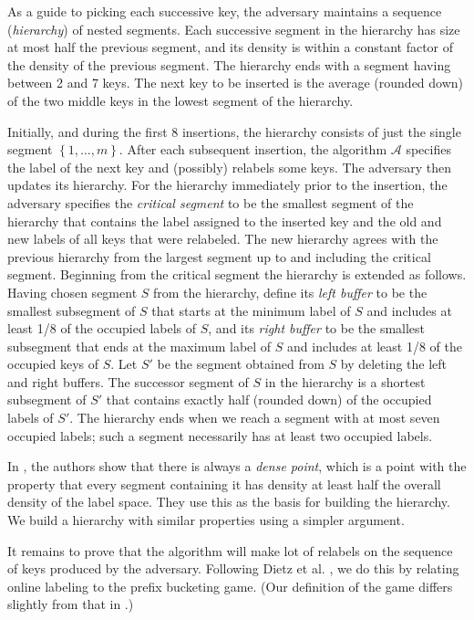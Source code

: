 \documentclass[11pt]{article}
\newcommand{\A}{\mathcal{A}}
\newcommand{\natInt}[2]{ \left\{ #1, \dotsc, #2 \right\} }
\begin{document}
As a guide to picking each successive key, the adversary maintains a sequence (\emph{hierarchy}) of nested segments.  Each successive segment in the hierarchy
has size at most half the previous segment, and its density  is within a constant factor of the density of the previous segment.
The hierarchy ends with a segment having between 2 and 7 keys.  The next key to be inserted is the average (rounded down)
of the two middle keys in the lowest segment of the hierarchy.


Initially, and during the first 8 insertions, the hierarchy consists of just the single segment $\natInt{1}{m}$.
After each subsequent insertion,
the algorithm $\A$ specifies the label of the next key and (possibly) relabels some keys. The adversary then updates
its hierarchy.  For the hierarchy immediately prior to the insertion, the adversary specifies the {\em critical segment} to be the smallest segment
of the hierarchy that contains the label assigned to the inserted key and the old and new labels
of all keys that were relabeled.  The new hierarchy agrees with the previous hierarchy from the largest segment up to and including
the critical segment.   Beginning from the critical segment the hierarchy is extended as follows.
Having chosen segment $S$ from the hierarchy, define its
{\em left buffer}
to be the smallest subsegment of $S$ that starts at the minimum label of $S$ and
includes at least 1/8 of the occupied labels of $S$, and its {\em right buffer} to be the smallest subsegment that ends at the maximum label of $S$
and includes at least 1/8 of the occupied keys of $S$.
Let $S'$ be the segment obtained from $S$ by
deleting the left and right buffers. The successor segment of $S$ in the hierarchy is
a shortest subsegment of $S'$ that contains exactly half (rounded down) of the occupied labels of $S'$.
The hierarchy ends when we reach a segment with at most seven occupied labels; such a segment necessarily has at least two occupied
labels.

In \cite{DSZ04}, the authors show that there is always a \emph{dense point}, which is
a point  with the property that every segment containing it
has density at least half the overall density of the label space.  They use this as the basis for building the hierarchy.
We build a hierarchy with similar properties using a simpler argument.

It remains to prove that the algorithm will make lot of relabels on the sequence
of keys produced by the adversary.  Following  Dietz et al. \cite{DSZ04}, we 
do this by relating online labeling to the prefix bucketing game.
(Our definition of the game differs slightly from that in \cite{DSZ04}.)
\end{document}
